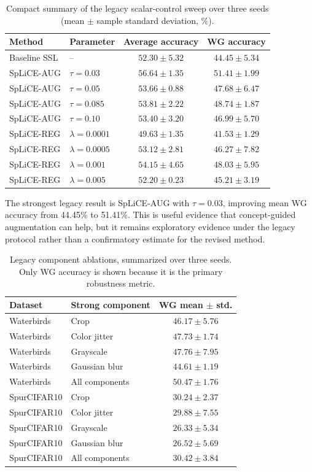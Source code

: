 \documentclass[11pt,a4paper]{article}
\begin{document}
\begin{table}[ht]
\centering
\small
\caption{Compact summary of the legacy scalar-control sweep over three seeds
(mean $\pm$ sample standard deviation, \%).}
\label{tab:results}
\begin{tabular}{llcc}
\toprule
Method & Parameter & Average accuracy & WG accuracy \\
\midrule
Baseline SSL & -- & $52.30\pm5.32$ & $44.45\pm5.34$ \\
SpLiCE-AUG & $\tau=0.03$ & $56.64\pm1.35$ & $51.41\pm1.99$ \\
SpLiCE-AUG & $\tau=0.05$ & $53.66\pm0.88$ & $47.68\pm6.47$ \\
SpLiCE-AUG & $\tau=0.085$ & $53.81\pm2.22$ & $48.74\pm1.87$ \\
SpLiCE-AUG & $\tau=0.10$ & $53.40\pm3.20$ & $46.99\pm5.70$ \\
SpLiCE-REG & $\lambda=0.0001$ & $49.63\pm1.35$ & $41.53\pm1.29$ \\
SpLiCE-REG & $\lambda=0.0005$ & $53.12\pm2.81$ & $46.27\pm7.82$ \\
SpLiCE-REG & $\lambda=0.001$ & $54.15\pm4.65$ & $48.03\pm5.95$ \\
SpLiCE-REG & $\lambda=0.005$ & $52.20\pm0.23$ & $45.21\pm3.19$ \\
\bottomrule
\end{tabular}
\end{table}

The strongest legacy result is SpLiCE-AUG with $\tau=0.03$, improving mean WG
accuracy from 44.45\% to 51.41\%. This is useful evidence that concept-guided
augmentation can help, but it remains exploratory evidence under the legacy
protocol rather than a confirmatory estimate for the revised method.

\begin{table}[ht]
\centering
\small
\caption{Legacy component ablations, summarized over three seeds. Only WG
accuracy is shown because it is the primary robustness metric.}
\label{tab:legacy_augmentation_components}
\begin{tabular}{llc}
\toprule
Dataset & Strong component & WG mean $\pm$ std. \\
\midrule
Waterbirds & Crop & $46.17\pm5.76$ \\
Waterbirds & Color jitter & $47.73\pm1.74$ \\
Waterbirds & Grayscale & $47.76\pm7.95$ \\
Waterbirds & Gaussian blur & $44.61\pm1.19$ \\
Waterbirds & All components & $50.47\pm1.76$ \\
\midrule
SpurCIFAR10 & Crop & $30.24\pm2.37$ \\
SpurCIFAR10 & Color jitter & $29.88\pm7.55$ \\
SpurCIFAR10 & Grayscale & $26.33\pm5.34$ \\
SpurCIFAR10 & Gaussian blur & $26.52\pm5.69$ \\
SpurCIFAR10 & All components & $30.42\pm3.84$ \\
\bottomrule
\end{tabular}
\end{table}
\end{document}
